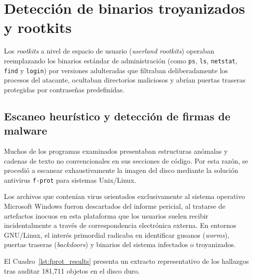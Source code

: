 \chapter{Detección de binarios troyanizados y rootkits}

Los \textit{rootkits} a nivel de espacio de usuario (\textit{userland rootkits}) operaban reemplazando los binarios estándar de administración (como \texttt{ps}, \texttt{ls}, \texttt{netstat}, \texttt{find} y \texttt{login}) por versiones adulteradas que filtraban deliberadamente los procesos del atacante, ocultaban directorios maliciosos y abrían puertas traseras protegidas por contraseñas predefinidas.

\section{Escaneo heurístico y detección de firmas de malware}

Muchos de los programas examinados presentaban estructuras anómalas y cadenas de texto no convencionales en sus secciones de código. Por esta razón, se procedió a escanear exhaustivamente la imagen del disco mediante la solución antivirus \texttt{f-prot} para sistemas Unix/Linux. 

Los archivos que contenían virus orientados exclusivamente al sistema operativo Microsoft Windows fueron descartados del informe pericial, al tratarse de artefactos inocuos en esta plataforma que los usuarios suelen recibir incidentalmente a través de correspondencia electrónica externa. En entornos GNU/Linux, el interés primordial radicaba en identificar gusanos (\textit{worms}), puertas traseras (\textit{backdoors}) y binarios del sistema infectados o troyanizados.

El Cuadro~\ref{lst:fprot_results} presenta un extracto representativo de los hallazgos tras auditar 181,711 objetos en el disco duro.

